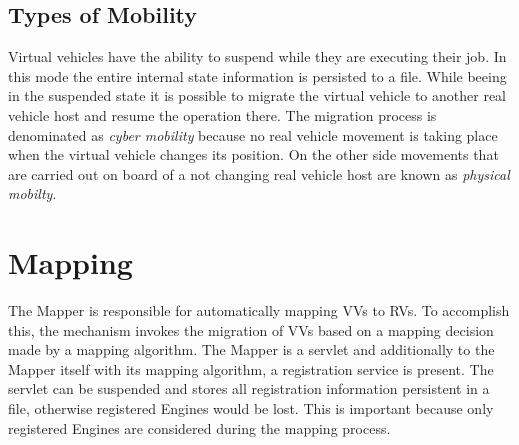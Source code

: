 \subsection{Types of Mobility}

Virtual vehicles have the ability to suspend while they are executing their job. In this mode the entire internal state information is persisted to a file. While beeing in the suspended state it is possible to migrate the virtual vehicle to another real vehicle host and resume the operation there. The migration process is denominated as \emph{cyber mobility} because no real vehicle movement is taking place when the virtual vehicle changes its position. On the other side movements that are carried out on board of a not changing real vehicle host are known as \emph{physical mobilty}.

% 






\section{Mapping}
The Mapper is responsible for automatically mapping \acp{VV} to \acp{RV}. To accomplish this, the mechanism invokes 
the migration of \acp{VV} based on a mapping decision made by a mapping algorithm. The Mapper is a servlet and
additionally to the Mapper itself with its mapping algorithm, a registration service is present. The servlet can be suspended and stores all
registration information persistent in a file, otherwise registered Engines would be lost. This is important because only registered 
Engines are considered during the mapping process.

